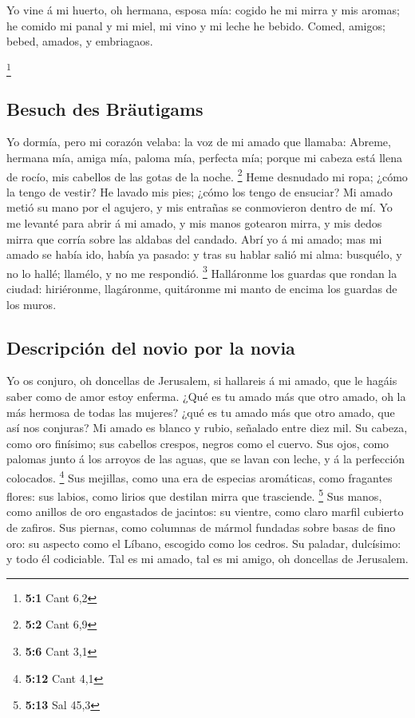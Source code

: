  Yo vine á mi huerto, oh hermana, esposa mía: cogido he mi
mirra y mis aromas; he comido mi panal y mi miel, mi vino y mi leche he
bebido. Comed, amigos; bebed, amados, y embriagaos.

\footnote{\textbf{5:1} Cant 6,2}

\hypertarget{besuch-des-bruxe4utigams}{%
\subsection{Besuch des Bräutigams}\label{besuch-des-bruxe4utigams}}

 Yo dormía, pero mi corazón velaba: la voz de mi amado que
llamaba: Abreme, hermana mía, amiga mía, paloma mía, perfecta mía;
porque mi cabeza está llena de rocío, mis cabellos de las gotas de la
noche. \footnote{\textbf{5:2} Cant 6,9}  Heme desnudado mi
ropa; ¿cómo la tengo de vestir? He lavado mis pies; ¿cómo los tengo de
ensuciar?  Mi amado metió su mano por el agujero, y mis
entrañas se conmovieron dentro de mí.  Yo me levanté para
abrir á mi amado, y mis manos gotearon mirra, y mis dedos mirra que
corría sobre las aldabas del candado.  Abrí yo á mi amado;
mas mi amado se había ido, había ya pasado: y tras su hablar salió mi
alma: busquélo, y no lo hallé; llamélo, y no me respondió. \footnote{\textbf{5:6}
  Cant 3,1}  Halláronme los guardas que rondan la ciudad:
hiriéronme, llagáronme, quitáronme mi manto de encima los guardas de los
muros.

\hypertarget{descripciuxf3n-del-novio-por-la-novia}{%
\subsection{Descripción del novio por la
novia}\label{descripciuxf3n-del-novio-por-la-novia}}

 Yo os conjuro, oh doncellas de Jerusalem, si hallareis á
mi amado, que le hagáis saber como de amor estoy enferma. 
¿Qué es tu amado más que otro amado, oh la más hermosa de todas las
mujeres? ¿qué es tu amado más que otro amado, que así nos conjuras?
 Mi amado es blanco y rubio, señalado entre diez mil.
 Su cabeza, como oro finísimo; sus cabellos crespos,
negros como el cuervo.  Sus ojos, como palomas junto á
los arroyos de las aguas, que se lavan con leche, y á la perfección
colocados. \footnote{\textbf{5:12} Cant 4,1}  Sus
mejillas, como una era de especias aromáticas, como fragantes flores:
sus labios, como lirios que destilan mirra que trasciende. \footnote{\textbf{5:13}
  Sal 45,3}  Sus manos, como anillos de oro engastados de
jacintos: su vientre, como claro marfil cubierto de zafiros.
 Sus piernas, como columnas de mármol fundadas sobre
basas de fino oro: su aspecto como el Líbano, escogido como los cedros.
 Su paladar, dulcísimo: y todo él codiciable. Tal es mi
amado, tal es mi amigo, oh doncellas de Jerusalem.

